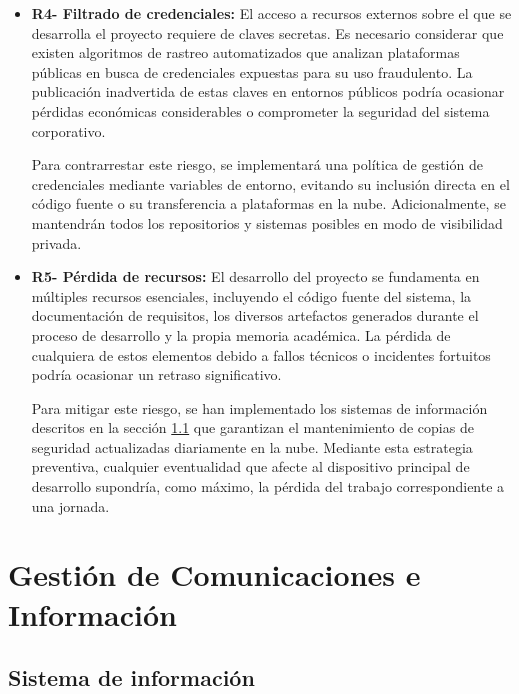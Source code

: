 \begin{itemize}
\item\textbf{R4- Filtrado de credenciales: }El acceso a recursos externos sobre el que se desarrolla el proyecto requiere de claves secretas. Es necesario considerar que existen algoritmos de rastreo automatizados que analizan plataformas públicas en busca de credenciales expuestas para su uso fraudulento. La publicación inadvertida de estas claves en entornos públicos podría ocasionar pérdidas económicas considerables o comprometer la seguridad del sistema corporativo.

Para contrarrestar este riesgo, se implementará una política de gestión de credenciales mediante variables de entorno, evitando su inclusión directa en el código fuente o su transferencia a plataformas en la nube. Adicionalmente, se mantendrán todos los repositorios y sistemas posibles en modo de visibilidad privada.

\item\textbf{R5- Pérdida de recursos: }El desarrollo del proyecto se fundamenta en múltiples recursos esenciales, incluyendo el código fuente del sistema, la documentación de requisitos, los diversos artefactos generados durante el proceso de desarrollo y la propia memoria académica. La pérdida de cualquiera de estos elementos debido a fallos técnicos o incidentes fortuitos podría ocasionar un retraso significativo.

Para mitigar este riesgo, se han implementado los sistemas de información descritos en la sección \ref{sec:sys_info} que garantizan el mantenimiento de copias de seguridad actualizadas diariamente en la nube. Mediante esta estrategia preventiva, cualquier eventualidad que afecte al dispositivo principal de desarrollo supondría, como máximo, la pérdida del trabajo correspondiente a una jornada.
\end{itemize}

\section{Gestión de Comunicaciones e Información}

\subsection{Sistema de información}\label{sec:sys_info}

